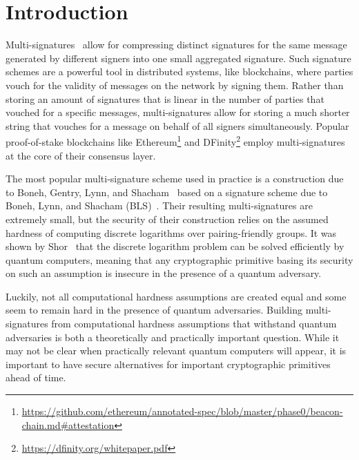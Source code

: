 \section{Introduction}\label{sec:intro}

Multi-signatures~\cite{NEC:ItaNak83,CCS:MicOhtRey01} allow for compressing distinct signatures for the same message generated by different signers into one small aggregated signature.
Such signature schemes are a powerful tool in distributed systems, like blockchains, where parties vouch for the validity of messages on the network by signing them. 
Rather than storing an amount of signatures that is linear in the number of parties that vouched for a specific messages, multi-signatures allow for storing a much shorter string that vouches for a message on behalf of all signers simultaneously.
Popular proof-of-stake blockchains like Ethereum\footnote{\url{https://github.com/ethereum/annotated-spec/blob/master/phase0/beacon-chain.md\#attestation}} and DFinity\footnote{\url{https://dfinity.org/whitepaper.pdf}} employ multi-signatures at the core of their consensus layer.

The most popular multi-signature scheme used in practice is a construction due to Boneh, Gentry, Lynn, and Shacham~\cite{EC:BGLS03} based on a signature scheme due to Boneh, Lynn, and Shacham (BLS)~\cite{AC:BonLynSha01}.
Their resulting multi-signatures are extremely small, but the security of their construction relies on the assumed hardness of computing discrete logarithms over pairing-friendly groups.
It was shown by Shor~\cite{Shor94} that the discrete logarithm problem can be solved efficiently by quantum computers, meaning that any cryptographic primitive basing its security on such an assumption is insecure in the presence of a quantum adversary.

Luckily, not all computational hardness assumptions are created equal and some seem to remain hard in the presence of quantum adversaries. 
Building multi-signatures from computational hardness assumptions that withstand quantum adversaries is both a theoretically and practically important question.
While it may not be clear when practically relevant quantum computers will appear, it is important to have secure alternatives for important cryptographic primitives ahead of time.

